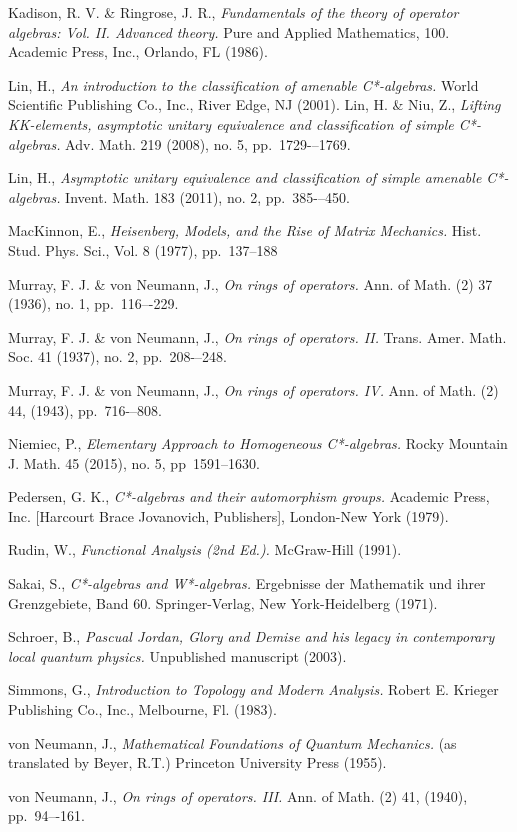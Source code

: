 \documentclass[12pt,a4paper]{report}
\theoremstyle{plain}
\theoremstyle{definition}
\newcommand{\1}{\mathbbm{1}}
\begin{document}
\begin{thebibliography}{00}
	Kadison, R. V. \& Ringrose, J. R.,
	\emph{Fundamentals of the theory of operator algebras: Vol. II. Advanced theory.}
	Pure and Applied Mathematics, 100. Academic Press, Inc., Orlando, FL (1986).
	
	Lin, H.,
	\emph{An introduction to the classification of amenable C*-algebras.}
	World Scientific Publishing Co., Inc., River Edge, NJ (2001).
	Lin, H. \& Niu, Z.,
	\emph{Lifting KK-elements, asymptotic unitary equivalence and classification of simple C*-algebras.}
	Adv. Math. 219 (2008), no. 5, pp.~1729-–1769. 
	
	Lin, H.,
	\emph{Asymptotic unitary equivalence and classification of simple amenable C*-algebras.}
	Invent. Math. 183 (2011), no. 2, pp.~385-–450. 

	MacKinnon, E.,
	\emph{Heisenberg, Models, and the Rise of Matrix Mechanics.}
	Hist. Stud. Phys. Sci., Vol. 8 (1977), pp.~137--188
	
	Murray, F. J. \& von Neumann, J.,
	\emph{On rings of operators.}
	Ann. of Math. (2) 37 (1936), no. 1, pp.~116–-229.

	Murray, F. J. \& von Neumann, J.,
	\emph{On rings of operators. II.}
	Trans. Amer. Math. Soc. 41 (1937), no. 2, pp.~208-–248. 

	Murray, F. J. \& von Neumann, J.,
	\emph{On rings of operators. IV.}
	Ann. of Math. (2) 44, (1943), pp.~716-–808.
	
	Niemiec, P.,
	\emph{Elementary Approach to Homogeneous C*-algebras.}
	Rocky Mountain J. Math. 45 (2015), no. 5, pp~1591--1630.	
	
	Pedersen, G. K.,
	\emph{C*-algebras and their automorphism groups.}
	Academic Press, Inc. [Harcourt Brace Jovanovich, Publishers], London-New York (1979).

	Rudin, W.,
	\emph{Functional Analysis (2nd Ed.).}
	McGraw-Hill (1991).

	Sakai, S.,
	\emph{C*-algebras and W*-algebras.}
	Ergebnisse der Mathematik und ihrer Grenzgebiete, Band 60. Springer-Verlag, New York-Heidelberg 
	(1971).

	Schroer, B.,
	\emph{Pascual Jordan, Glory and Demise and his legacy in contemporary local quantum physics.}
	Unpublished manuscript (2003).
	
	Simmons, G.,
	\emph{Introduction to Topology and Modern Analysis.}
	Robert E. Krieger Publishing Co., Inc., Melbourne, Fl. (1983).

	von Neumann, J.,
	\emph{Mathematical Foundations of Quantum Mechanics.}
	(as translated by Beyer, R.T.)
	Princeton University Press (1955).

	von Neumann, J.,
	\emph{On rings of operators. III.}
	Ann. of Math. (2) 41, (1940), pp.~94–-161.

	
\end{thebibliography}
\end{document}
